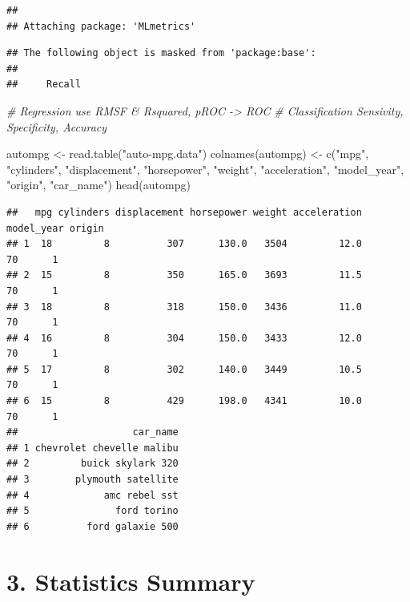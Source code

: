 \documentclass[
]{article}
\newenvironment{Shaded}{\begin{snugshade}}{\end{snugshade}}
\newcommand{\CommentTok}[1]{\textcolor[rgb]{0.56,0.35,0.01}{\textit{#1}}}
\newcommand{\FunctionTok}[1]{\textcolor[rgb]{0.00,0.00,0.00}{#1}}
\newcommand{\NormalTok}[1]{#1}
\newcommand{\OtherTok}[1]{\textcolor[rgb]{0.56,0.35,0.01}{#1}}
\newcommand{\StringTok}[1]{\textcolor[rgb]{0.31,0.60,0.02}{#1}}
\begin{document}
\begin{verbatim}
## 
## Attaching package: 'MLmetrics'
\end{verbatim}

\begin{verbatim}
## The following object is masked from 'package:base':
## 
##     Recall
\end{verbatim}

\begin{Shaded}
\begin{Highlighting}[]
\CommentTok{\# Regression use RMSF \& Rsquared, pROC {-}\textgreater{} ROC}
\CommentTok{\# Classification Sensivity, Specificity, Accuracy}

\NormalTok{autompg }\OtherTok{\textless{}{-}} \FunctionTok{read.table}\NormalTok{(}\StringTok{"auto{-}mpg.data"}\NormalTok{)}
\FunctionTok{colnames}\NormalTok{(autompg) }\OtherTok{\textless{}{-}} \FunctionTok{c}\NormalTok{(}\StringTok{"mpg"}\NormalTok{, }\StringTok{"cylinders"}\NormalTok{, }\StringTok{"displacement"}\NormalTok{, }\StringTok{"horsepower"}\NormalTok{, }\StringTok{"weight"}\NormalTok{, }\StringTok{"acceleration"}\NormalTok{, }\StringTok{"model\_year"}\NormalTok{, }\StringTok{"origin"}\NormalTok{, }\StringTok{"car\_name"}\NormalTok{)}
\FunctionTok{head}\NormalTok{(autompg)}
\end{Highlighting}
\end{Shaded}

\begin{verbatim}
##   mpg cylinders displacement horsepower weight acceleration model_year origin
## 1  18         8          307      130.0   3504         12.0         70      1
## 2  15         8          350      165.0   3693         11.5         70      1
## 3  18         8          318      150.0   3436         11.0         70      1
## 4  16         8          304      150.0   3433         12.0         70      1
## 5  17         8          302      140.0   3449         10.5         70      1
## 6  15         8          429      198.0   4341         10.0         70      1
##                    car_name
## 1 chevrolet chevelle malibu
## 2         buick skylark 320
## 3        plymouth satellite
## 4             amc rebel sst
## 5               ford torino
## 6          ford galaxie 500
\end{verbatim}

\hypertarget{statistics-summary}{%
\section{3. Statistics Summary}\label{statistics-summary}}
\end{document}
